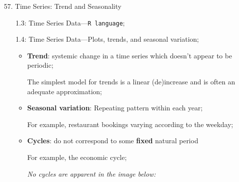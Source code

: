 \documentclass[12pt, titlepage, french]{report}
\begin{document}
\begin{CHPT_SUMM_AUTO}[label = {L.-57}]{57. Time Series: Trend and Seasonality}
\begin{itemize}
\begin{itemize}
\begin{itemize}
			\item	The data could have been aggregated over the period (for example, the number of foreign tourists arriving per day);
			\item	The data could have been sampled over the period (for example, the daily close price of Apple stock).
			\end{itemize}
		\end{itemize}
	\item[1.3:]	Time Series Data---\texttt{R language};
	\item[1.4:]	Time Series Data---Plots, trends, and seasonal variation;
		\begin{itemize}
		\item	\textbf{Trend}: systemic change in a time series which doesn't appear to be periodic;
		\item[]	The simplest model for trends is a linear (de)increase and is often an adequate approximation;
		\item	\textbf{Seasonal variation}: Repeating pattern within each year;
		\item[]	For example, restaurant bookings varying according to the weekday;
		\item	\textbf{Cycles}: do not correspond to some \textbf{fixed} natural period
		\item[]	For example, the economic cycle;
		\item[]	\textit{No cycles are apparent in the image below:}
		

\end{itemize}
\end{itemize}
\end{CHPT_SUMM_AUTO}
\end{document}
